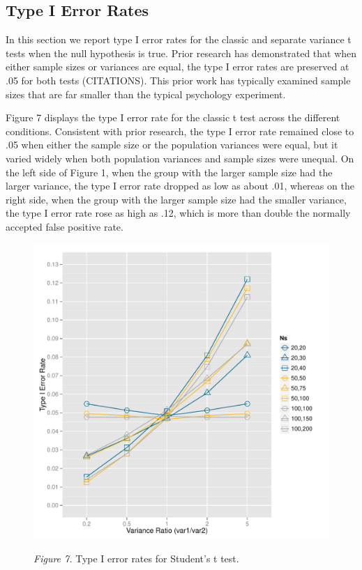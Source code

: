 \documentclass[man,a4paper,noextraspace,apacite]{apa6}\usepackage[]{graphicx}\usepackage[]{color}
\makeatletter
\def\maxwidth{ %
  \ifdim\Gin@nat@width>\linewidth
    \linewidth
  \else
    \Gin@nat@width
  \fi
}
\newenvironment{knitrout}{}{} %
\makeatother
\begin{document}
\subsection{Type I Error Rates}


    In this section we report type I error rates for the classic and separate variance t tests when the null hypothesis is true. Prior research has demonstrated that when either sample sizes or variances are equal, the type I error rates are preserved at .05 for both tests (CITATIONS). This prior work has typically examined sample sizes that are far smaller than the typical psychology experiment.
    
    Figure 7 displays the type I error rate for the classic t test across the different conditions. Consistent with prior research, the type I error rate remained close to .05 when either the sample size or the population variances were equal, but it varied widely when both population variances and sample sizes were unequal. On the left side of Figure 1, when the group with the larger sample size had the larger variance, the type I error rate dropped as low as about .01, whereas on the right side, when the group with the larger sample size had the smaller variance, the type I error rate rose as high as .12, which is more than double the normally accepted false positive rate. 

\begin{figure}    
\begin{knitrout}
\color{fgcolor}
\includegraphics[width=\maxwidth]{figure/type1_classic_plot} 

\end{knitrout}
\textit{Figure 7.} Type I error rates for Student's t test.
\end{figure}
\end{document}
